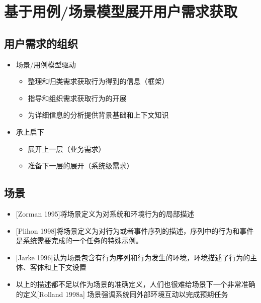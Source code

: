 \section{基于用例/场景模型展开用户需求获取}

\subsection{用户需求的组织}
\begin{itemize}
    \item 场景/用例模型驱动
    \begin{itemize}
        \item 整理和归类需求获取行为得到的信息（框架）
        \item 指导和组织需求获取行为的开展
        \item 为详细信息的分析提供背景基础和上下文知识 
    \end{itemize}
    \item 承上启下
    \vspace{-0.8em}
	\begin{multicols}{2}
    \begin{itemize}
        \item 展开上一层（业务需求）
        \item 准备下一层的展开（系统级需求）
    \end{itemize}
	\end{multicols}
\end{itemize}

\subsection{场景}
\begin{itemize}
    \item $[$Zorman 1995]将场景定义为对系统和环境行为的局部描述
    \item $[$Plihon 1998]将场景定义为对行为或者事件序列的描述，序列中的行为和事件是系统需要完成的一个任务的特殊示例。
    \item $[$Jarke 1996]认为场景包含有行为序列和行为发生的环境，环境描述了行为的主体、客体和上下文设置
    \item 以上的描述都不足以作为场景的准确定义，人们也很难给场景下一个非常准确的定义[Rolland 1998a]
    场景强调系统同外部环境互动以完成预期任务
\end{itemize}

